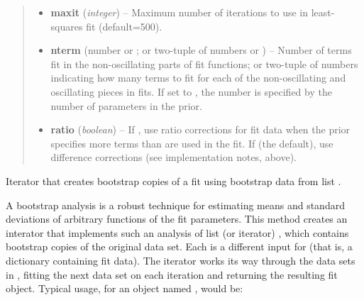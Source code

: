 \documentclass[letterpaper,10pt,english]{sphinxmanual}
\begin{document}
\begin{fulllineitems}
\begin{quote}
\begin{description}
\begin{itemize}
\item {} 
\textbf{maxit} (\emph{integer}) -- Maximum number of iterations to use in least-squares fit 
(default=500).

\item {} 
\textbf{nterm} (number or ; or two-tuple of numbers or ) -- Number of terms fit in the non-oscillating parts of fit 
functions; or two-tuple of numbers indicating how many terms to fit
for each of the non-oscillating and oscillating pieces in fits. If set
to , the number is specified by the number of parameters in
the prior.

\item {} 
\textbf{ratio} (\emph{boolean}) -- If , use ratio corrections for fit 
data when the prior specifies more terms than are used in the fit. If
 (the default), use difference corrections 
(see implementation notes, above).

\end{itemize}

\end{description}\end{quote}

\begin{fulllineitems}
\label{corrfitter:corrfitter.CorrFitter.bootstrap_fit_iter}
Iterator that creates bootstrap copies of a {\hyperref[corrfitter:corrfitter.CorrFitter]{}} fit using 
bootstrap data from list .

A bootstrap analysis is a robust technique for estimating means and
standard deviations of arbitrary functions of the fit parameters.
This method creates an interator that implements such an analysis
of list (or iterator) , which contains bootstrap
copies of the original data set. Each  is a different
 input for  (that is, a dictionary containing
fit data). The iterator works its way through the data sets in
, fitting the next data set on each iteration and
returning the resulting  fit object. Typical
usage, for an {\hyperref[corrfitter:corrfitter.CorrFitter]{}} object named , would be:


\end{fulllineitems}
\end{fulllineitems}
\end{document}
